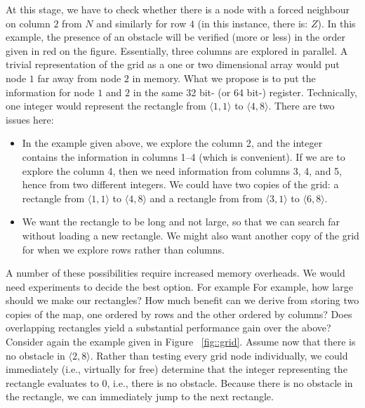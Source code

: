 At this stage, we have to check 
whether there is a node with a forced neighbour on column $2$ from $N$ 
and similarly for row $4$ (in this instance, there is: $Z$).  
In this example, the presence of an obstacle 
will be verified (more or less) in the order given in red on the figure.  
Essentially, three columns are explored in parallel.  
A trivial representation of the grid as a one or two dimensional array
would put node $1$ far away from node $2$ in memory.  
What we propose is to put the information for node $1$ and $2$ 
in the same 32 bit- (or 64 bit-) register.  
Technically, one integer would represent the rectangle 
from $\langle 1,1\rangle$ to $\langle 4,8\rangle$.  
There are two issues here: 
\begin{itemize}
\item 
  In the example given above, we explore the column 2, 
  and the integer contains the information in columns 1--4 
  (which is convenient).  
  If we are to explore the column 4, 
  then we need information from columns 3, 4, and 5, 
  hence from two different integers.  
  We could have two copies of the grid: 
  a rectangle from $\langle 1,1\rangle$ to $\langle 4,8\rangle$ 
  and a rectangle from from $\langle 3,1\rangle$ to $\langle 6,8\rangle$.  
\item 
  We want the rectangle to be long and not large, 
  so that we can search far without loading a new rectangle.  
  We might also want another copy of the grid for when we explore rows
  rather than columns.
\end{itemize}
A number of these possibilities require increased memory overheads. 
We would need experiments to decide the best option. For example
For example, how large should we make our rectangles? How much benefit can we
derive from storing two copies of the map, one ordered by rows and the other
ordered by columns? Does overlapping rectangles yield a substantial
performance gain over the above?
Consider again the example given in Figure  ~\ref{fig::grid}.  
Assume now that there is no obstacle in $\langle 2,8\rangle$.  
Rather than testing every grid node individually, 
we could immediately (i.e., virtually for free) determine 
that the integer representing the rectangle 
evaluates to $0$, i.e., there is no obstacle.  
Because there is no obstacle in the rectangle, 
we can immediately jump to the next rectangle.  

